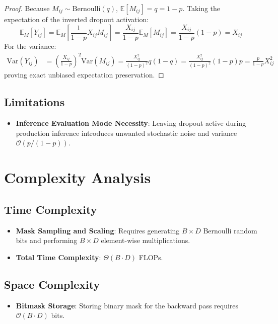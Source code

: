 \documentclass[11pt,a4paper]{article}
\theoremstyle{definition}
\begin{document}
\begin{proof}
Because $M_{ij} \sim \text{Bernoulli}(q)$, $\mathbb{E}[M_{ij}] = q = 1 - p$.
Taking the expectation of the inverted dropout activation:
\begin{equation}
\mathbb{E}_M[Y_{ij}] = \mathbb{E}_M \left[ \frac{1}{1-p} X_{ij} M_{ij} \right] = \frac{X_{ij}}{1-p} \mathbb{E}_M[M_{ij}] = \frac{X_{ij}}{1-p} (1-p) = X_{ij}
\end{equation}
For the variance:
\begin{align}
\text{Var}(Y_{ij}) &= \left( \frac{X_{ij}}{1-p} \right)^2 \text{Var}(M_{ij}) = \frac{X_{ij}^2}{(1-p)^2} q(1-q) = \frac{X_{ij}^2}{(1-p)^2} (1-p)p = \frac{p}{1-p} X_{ij}^2
\end{align}
proving exact unbiased expectation preservation.
\end{proof}

\subsection{Limitations}
\begin{itemize}
    \item \textbf{Inference Evaluation Mode Necessity}: Leaving dropout active during production inference introduces unwanted stochastic noise and variance $\mathcal{O}(p/(1-p))$.
\end{itemize}

\section{Complexity Analysis}

\subsection{Time Complexity}
\begin{itemize}
    \item \textbf{Mask Sampling and Scaling}: Requires generating $B \times D$ Bernoulli random bits and performing $B \times D$ element-wise multiplications.
    \item \textbf{Total Time Complexity}: $\Theta(B \cdot D)$ FLOPs.
\end{itemize}

\subsection{Space Complexity}
\begin{itemize}
    \item \textbf{Bitmask Storage}: Storing binary mask for the backward pass requires $\mathcal{O}(B \cdot D)$ bits.
\end{itemize}
\end{document}
